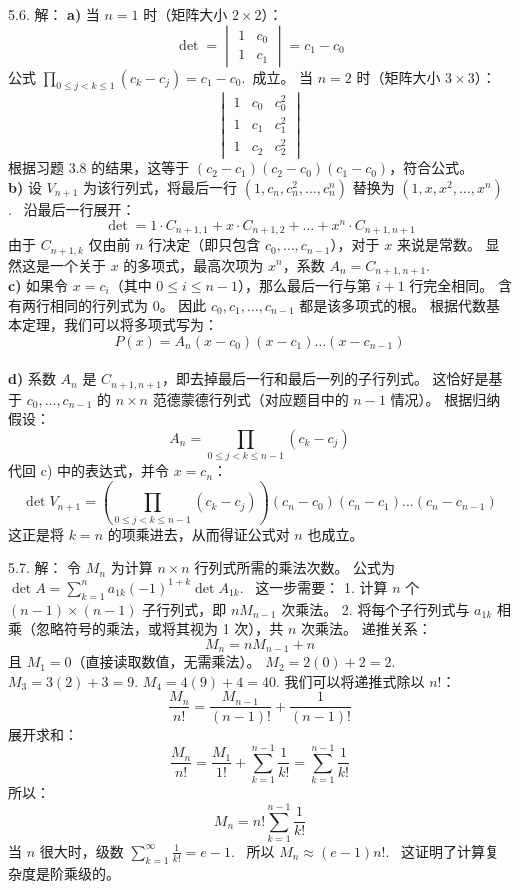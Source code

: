 \begin{exer}
5.6. 解：
\textbf{a)}
当 $n=1$ 时（矩阵大小 $2 \times 2$）：
$$ \det = \begin{vmatrix} 1 & c_0 \\ 1 & c_1 \end{vmatrix} = c_1 - c_0 $$
公式 $\prod_{0 \le j < k \le 1} (c_k - c_j) = c_1 - c_0$.~成立。
当 $n=2$ 时（矩阵大小 $3 \times 3$）：
$$ \begin{vmatrix} 1 & c_0 & c_0^2 \\ 1 & c_1 & c_1^2 \\ 1 & c_2 & c_2^2 \end{vmatrix} $$
根据习题 3.8 的结果，这等于 $(c_2-c_1)(c_2-c_0)(c_1-c_0)$，符合公式。
\\
\textbf{b)}
设 $V_{n+1}$ 为该行列式，将最后一行 $(1, c_n, c_n^2, \dots, c_n^n)$ 替换为 $(1, x, x^2, \dots, x^n)$.~
沿最后一行展开：
$$ \det = 1 \cdot C_{n+1, 1} + x \cdot C_{n+1, 2} + \dots + x^n \cdot C_{n+1, n+1} $$
由于 $C_{n+1, k}$ 仅由前 $n$ 行决定（即只包含 $c_0, \dots, c_{n-1}$），对于 $x$ 来说是常数。
显然这是一个关于 $x$ 的多项式，最高次项为 $x^n$，系数 $A_n = C_{n+1, n+1}$.~
\\
\textbf{c)}
如果令 $x = c_i$（其中 $0 \le i \le n-1$），那么最后一行与第 $i+1$ 行完全相同。
含有两行相同的行列式为 0。
因此 $c_0, c_1, \dots, c_{n-1}$ 都是该多项式的根。
根据代数基本定理，我们可以将多项式写为：
$$ P(x) = A_n (x - c_0)(x - c_1)\dots(x - c_{n-1}) $$
\\
\textbf{d)}
系数 $A_n$ 是 $C_{n+1, n+1}$，即去掉最后一行和最后一列的子行列式。
这恰好是基于 $c_0, \dots, c_{n-1}$ 的 $n \times n$ 范德蒙德行列式（对应题目中的 $n-1$ 情况）。
根据归纳假设：
$$ A_n = \prod_{0 \le j < k \le n-1} (c_k - c_j) $$
代回 c) 中的表达式，并令 $x = c_n$：
$$ \det V_{n+1} = \left( \prod_{0 \le j < k \le n-1} (c_k - c_j) \right) (c_n - c_0)(c_n - c_1)\dots(c_n - c_{n-1}) $$
这正是将 $k=n$ 的项乘进去，从而得证公式对 $n$ 也成立。

5.7. 解：
令 $M_n$ 为计算 $n \times n$ 行列式所需的乘法次数。
公式为 $\det A = \sum_{k=1}^n a_{1k} (-1)^{1+k} \det A_{1k}$.~
这一步需要：
1. 计算 $n$ 个 $(n-1) \times (n-1)$ 子行列式，即 $n M_{n-1}$ 次乘法。
2. 将每个子行列式与 $a_{1k}$ 相乘（忽略符号的乘法，或将其视为 1 次），共 $n$ 次乘法。
递推关系：
$$ M_n = n M_{n-1} + n $$
且 $M_1 = 0$（直接读取数值，无需乘法）。
$M_2 = 2(0) + 2 = 2$.~
$M_3 = 3(2) + 3 = 9$.
$M_4 = 4(9) + 4 = 40$.
我们可以将递推式除以 $n!$：
$$ \frac{M_n}{n!} = \frac{M_{n-1}}{(n-1)!} + \frac{1}{(n-1)!} $$
展开求和：
$$ \frac{M_n}{n!} = \frac{M_1}{1!} + \sum_{k=1}^{n-1} \frac{1}{k!} = \sum_{k=1}^{n-1} \frac{1}{k!} $$
所以：
$$ M_n = n! \sum_{k=1}^{n-1} \frac{1}{k!} $$
当 $n$ 很大时，级数 $\sum_{k=1}^{\infty} \frac{1}{k!} = e - 1$.~
所以 $M_n \approx (e-1) n!$.~
这证明了计算复杂度是阶乘级的。


\end{exer}

